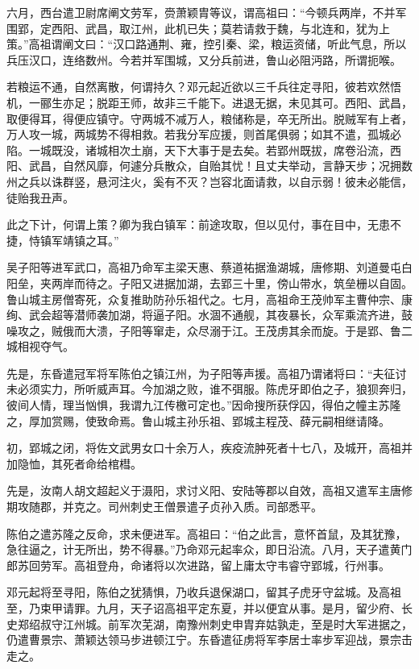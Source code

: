 \documentclass[12pt,UTF8]{ctexbook}
\begin{document}
六月，西台遣卫尉席阐文劳军，赍萧颖胄等议，谓高祖曰：“今顿兵两岸，不并军围郢，定西阳、武昌，取江州，此机已失；莫若请救于魏，与北连和，犹为上策。”高祖谓阐文曰：“汉口路通荆、雍，控引秦、梁，粮运资储，听此气息，所以兵压汉口，连络数州。今若并军围城，又分兵前进，鲁山必阻沔路，所谓扼喉。

若粮运不通，自然离散，何谓持久？邓元起近欲以三千兵往定寻阳，彼若欢然悟机，一郦生亦足；脱距王师，故非三千能下。进退无据，未见其可。西阳、武昌，取便得耳，得便应镇守。守两城不减万人，粮储称是，卒无所出。脱贼军有上者，万人攻一城，两城势不得相救。若我分军应援，则首尾俱弱；如其不遣，孤城必陷。一城既没，诸城相次土崩，天下大事于是去矣。若郢州既拔，席卷沿流，西阳、武昌，自然风靡，何遽分兵散众，自贻其忧！且丈夫举动，言静天步；况拥数州之兵以诛群竖，悬河注火，奚有不灭？岂容北面请救，以自示弱！彼未必能信，徒贻我丑声。

此之下计，何谓上策？卿为我白镇军：前途攻取，但以见付，事在目中，无患不捷，恃镇军靖镇之耳。”

吴子阳等进军武口，高祖乃命军主梁天惠、蔡道祐据渔湖城，唐修期、刘道曼屯白阳垒，夹两岸而待之。子阳又进据加湖，去郢三十里，傍山带水，筑垒栅以自固。鲁山城主房僧寄死，众复推助防孙乐祖代之。七月，高祖命王茂帅军主曹仲宗、康绚、武会超等潜师袭加湖，将逼子阳。水涸不通舰，其夜暴长，众军乘流齐进，鼓噪攻之，贼俄而大溃，子阳等窜走，众尽溺于江。王茂虏其余而旋。于是郢、鲁二城相视夺气。

先是，东昏遣冠军将军陈伯之镇江州，为子阳等声援。高祖乃谓诸将曰：“夫征讨未必须实力，所听威声耳。今加湖之败，谁不弭服。陈虎牙即伯之子，狼狈奔归，彼间人情，理当忷惧，我谓九江传檄可定也。”因命搜所获俘囚，得伯之幢主苏隆之，厚加赏赐，使致命焉。鲁山城主孙乐祖、郢城主程茂、薛元嗣相继请降。

初，郢城之闭，将佐文武男女口十余万人，疾疫流肿死者十七八，及城开，高祖并加隐恤，其死者命给棺槥。

先是，汝南人胡文超起义于滠阳，求讨义阳、安陆等郡以自效，高祖又遣军主唐修期攻随郡，并克之。司州刺史王僧景遣子贞孙入质。司部悉平。

陈伯之遣苏隆之反命，求未便进军。高祖曰：“伯之此言，意怀首鼠，及其犹豫，急往逼之，计无所出，势不得暴。”乃命邓元起率众，即日沿流。八月，天子遣黄门郎苏回劳军。高祖登舟，命诸将以次进路，留上庸太守韦睿守郢城，行州事。

邓元起将至寻阳，陈伯之犹猜惧，乃收兵退保湖口，留其子虎牙守盆城。及高祖至，乃束甲请罪。九月，天子诏高祖平定东夏，并以便宜从事。是月，留少府、长史郑绍叔守江州城。前军次芜湖，南豫州刺史申胄弃姑孰走，至是时大军进据之，仍遣曹景宗、萧颖达领马步进顿江宁。东昏遣征虏将军李居士率步军迎战，景宗击走之。
\end{document}
